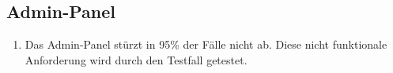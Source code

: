 \subsection*{Admin-Panel}

\begin{samepage}
    \begin{enumerate}[label=\textbf{/NFZ\arabic*0/}, align=left, start=2]
        \item \label{/NFZ20/} Das \Gls{Admin-Panel} stürzt in 95\% der Fälle nicht ab. Diese nicht funktionale Anforderung wird durch den Testfall  getestet.
    \end{enumerate}
\end{samepage}